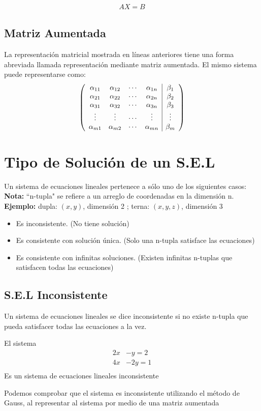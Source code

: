 \begin{align*}
AX=B
\end{align*}
\subsection{Matriz Aumentada}
La representación matricial mostrada en líneas anteriores tiene una forma abreviada llamada representación mediante matriz aumentada. El mismo sistema puede representarse como:
\begin{align*}
\reducir{cccc|c}{
\alpha_{11} &\alpha_{12} &\cdots&\alpha_{1n}&\beta_1 \\
\alpha_{21} &\alpha_{22} &\cdots&\alpha_{2n}&\beta_2 \\
\alpha_{31} &\alpha_{32} &\cdots&\alpha_{3n}&\beta_3 \\
\vdots&\vdots&\cdots&\vdots&\vdots\\
\alpha_{m1} &\alpha_{m2} &\cdots&\alpha_{mn}&\beta_m\\
}
\end{align*}

\section{Tipo de Solución de un S.E.L}
Un sistema de ecuaciones lineales pertenece a sólo uno de los siguientes casos:
~\\\textbf{Nota:} ``n-tupla" se refiere a un arreglo de coordenadas en la dimensión n.\\\textbf{Ejemplo: } dupla: $(x,y)$, dimensión 2 ; 
terna: $(x,y,z)$, dimensión 3
\begin{itemize}
\item Es inconsistente. (No tiene solución)
\item Es consistente con solución única. (Solo una n-tupla satisface las ecuaciones)
\item Es consistente con infinitas soluciones. (Existen infinitas n-tuplas que satisfacen todas las ecuaciones)
\end{itemize}
\subsection{S.E.L Inconsistente}
Un sistema de ecuaciones lineales se dice inconsistente si no existe n-tupla que pueda satisfacer todas las ecuaciones a la vez. 
\begin{ejemplo}
El sistema 
\begin{align*}
2x&-y=2\\
4x&-2y=1\\
\end{align*}
Es un sistema de ecuaciones lineales inconsistente 
\end{ejemplo}
Podemos comprobar que el sistema es inconsistente utilizando el método de Gauss, al representar al sistema por medio de una matriz aumentada

